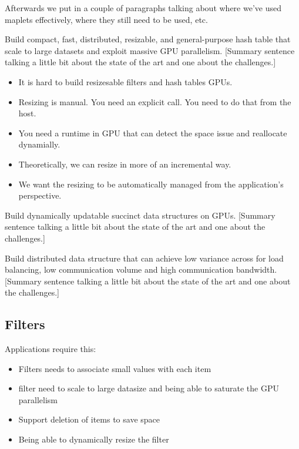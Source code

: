 Afterwards  we put in a couple of paragraphs talking about where we've used maplets effectively, where they still need to be used, etc.

\begin{rproblem}
Build compact, fast, distributed, resizable, and general-purpose hash table that scale to large datasets and exploit massive GPU parallelism. 
[Summary sentence talking a little bit about the state of the art and one about the challenges.]
\label{rprob:peppermint}
\end{rproblem}

\begin{itemize}
    \item It is hard to build resizesable filters and hash tables GPUs.
    \item Resizing is manual. You need an explicit call.  You need to do that from the host. 
    \item You need a runtime in GPU that can detect the space issue and reallocate dynamially.
    \item Theoretically, we can resize in more of an incremental way.
    \item We want the resizing to be automatically managed from the application's perspective. 
\end{itemize}


\begin{rproblem}
Build dynamically updatable succinct data structures on GPUs.
[Summary sentence talking a little bit about the state of the art and one about the challenges.]
\label{rprob:peppermint}
\end{rproblem}

\begin{rproblem}
Build distributed data structure that can achieve low variance across for load balancing, low communication volume and high communication bandwidth. 
[Summary sentence talking a little bit about the state of the art and one about the challenges.]
\label{rprob:peppermint}
\end{rproblem}




\subsection{Filters}
Applications require this:
\begin{itemize}
    \item Filters needs to associate small values with each item
    \item filter need to scale to large datasize and being able to saturate the GPU parallelism
    \item Support deletion of items to save space
    \item Being able to dynamically resize the filter
\end{itemize}

